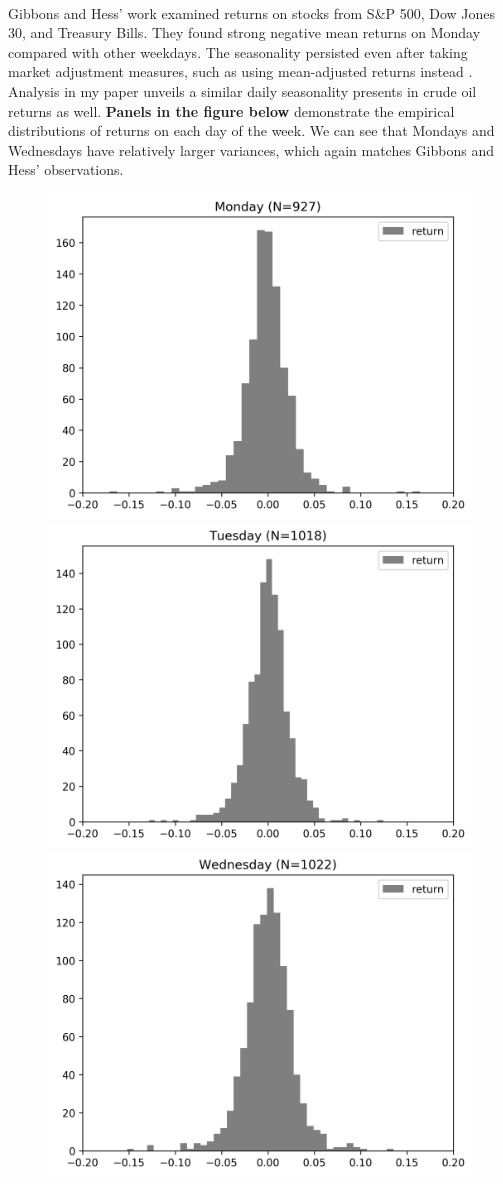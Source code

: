 \documentclass[12pt]{article}
\begin{document}
	\paragraph{} Gibbons and Hess' work examined returns on stocks from S\&P 500, Dow Jones 30, and Treasury Bills. They found strong negative mean returns on Monday compared with other weekdays.
	The seasonality persisted even after taking market adjustment measures, such as using mean-adjusted returns instead \cite{Hess1981}. 
	Analysis in my paper unveils a similar daily seasonality presents in crude oil returns as well.
	\textbf{Panels in the figure below} demonstrate the empirical distributions of returns on each day of the week. We can see that Mondays and Wednesdays have relatively larger variances, which again matches Gibbons and Hess' observations.
	\begin{figure}[H]
		\centering
		\small
		\includegraphics[width=0.45\linewidth]{figures/day_of_week_effect/dist_returns_Monday.png}
		\includegraphics[width=0.45\linewidth]{figures/day_of_week_effect/dist_returns_Tuesday.png}
		\includegraphics[width=0.45\linewidth]{figures/day_of_week_effect/dist_returns_Wednesday.png}

\end{figure}
\end{document}
